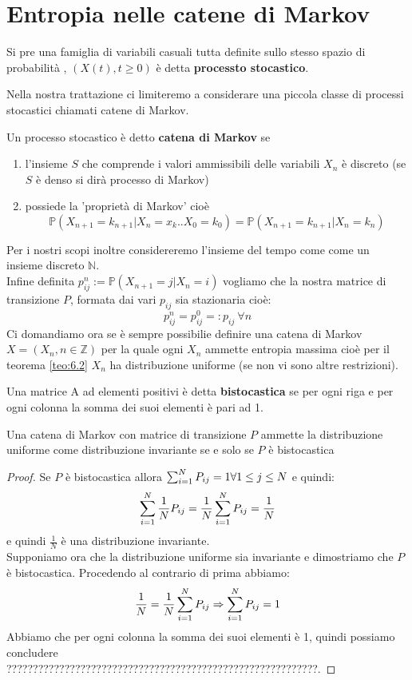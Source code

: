 \section{Entropia nelle catene di Markov}
\label{sec:markEntropia}
\begin{defi}
Si pre una famiglia di variabili casuali tutta definite sullo stesso spazio di probabilità \spacep , $(X(t), t \geq 0 )$ è detta \textbf{processto stocastico}.
\end{defi}
Nella nostra trattazione ci limiteremo a considerare una piccola classe di processi stocastici chiamati catene di Markov.
\begin{defi} \label{defi:cateMarkov}
Un processo stocastico è detto \textbf{catena di Markov} se 
\begin{enumerate}
\item l'insieme $S$ che comprende i valori ammissibili delle variabili $X_n$ è discreto (se $S$ è denso si dirà processo di Markov)
\item possiede la 'proprietà di Markov' cioè
 $$\mathbb{P}(X_{n+1}=k_{n+1}|X_n=x_k..X_0=k_0)=\mathbb{P}(X_{n+1}=k_{n+1} | X_n=k_n)$$
\end{enumerate}
\end{defi}
Per i nostri scopi inoltre considereremo l'insieme del tempo come come un insieme discreto $\mathbb{N}$.\\
Infine definita $p_{ij}^n:=\mathbb{P}(X_{n+1}=j|X_n=i)$ vogliamo che la nostra matrice di transizione $P$, formata dai vari $p_{ij}$ sia stazionaria cioè:\\
$$p_{ij}^n=p_{ij}^0=: p_{ij} \  \forall n$$
Ci domandiamo ora se è sempre possibilie definire una catena di Markov $X=(X_n,n\in\mathbb{Z})$ per la quale ogni $X_n$ ammette entropia massima cioè per il teorema \ref{teo:6.2} $X_n$ ha distribuzione uniforme (se non vi sono altre restrizioni).
\begin{defi}
Una matrice A ad elementi positivi è detta \textbf{bistocastica} se per ogni riga e per ogni colonna la somma dei suoi elementi è pari ad 1.
\end{defi}
\begin{teo}
Una catena di Markov con matrice di transizione $P$ ammette la distribuzione uniforme come distribuzione invariante se e solo se $P$ è bistocastica
\end{teo}
\begin{proof}
Se $P$ è bistocastica allora $ \sum_{i=1}^N P_{ij}=1 \forall 1\leq j \leq N$ e quindi:
$$\sum_{i=1}^N \frac{1}{N}P_{ij}=\frac{1}{N}\sum_{i=1}^N P_{ij}=\frac{1}{N}$$
e quindi $\frac{1}{N}$ è una distribuzione invariante.\\
Supponiamo ora che la distribuzione uniforme sia invariante e dimostriamo che $P$ è bistocastica. Procedendo al contrario di prima abbiamo:
$$\frac{1}{N}=\frac{1}{N} \sum_{i=1}^N P_{ij} \Rightarrow \sum_{i=1}^N P_{ij}=1$$
Abbiamo che per ogni colonna la somma dei suoi elementi è 1, quindi possiamo concludere\\
???????????????????????????????????????????????????????????.
\end{proof}

